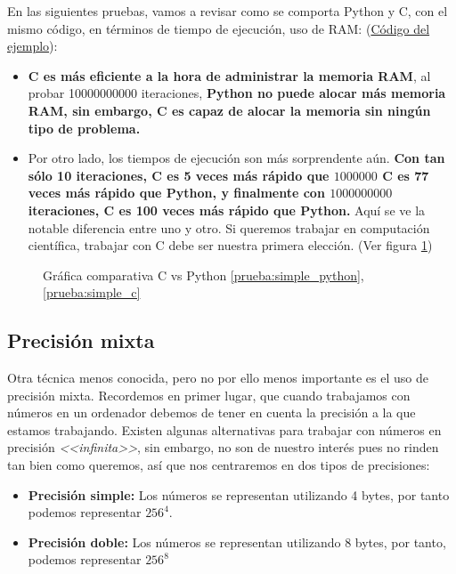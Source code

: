 En las siguientes pruebas, vamos a revisar como se comporta Python y C, con el mismo código, en términos de tiempo de ejecución, uso de RAM: (\hyperref[prueba:cvspython]{Código del ejemplo}):

\begin{itemize}
\item \textbf{C es más eficiente a la hora de administrar la memoria RAM}, al probar 10000000000 iteraciones, \textbf{Python no puede alocar más memoria RAM, sin embargo, C es capaz de alocar la memoria sin ningún tipo de problema.}
  
\item Por otro lado, los tiempos de ejecución son más sorprendente aún. \textbf{Con tan sólo 10 iteraciones, C es 5 veces más rápido que $1000000$ C es 77 veces más rápido que Python, y finalmente con $1000000000$ iteraciones, C es 100 veces más rápido que Python.} Aquí se ve la notable diferencia entre uno y otro. Si queremos trabajar en computación científica, trabajar con C debe ser nuestra primera elección. (Ver figura \ref{fig:cvspython})
\end{itemize}

\begin{figure}[h]
  \centering
  \caption{Gráfica comparativa C vs Python \ref{prueba:simple_python}, \ref{prueba:simple_c}}
  \label{fig:cvspython}
\end{figure}

\subsection{Precisión mixta}
Otra técnica menos conocida, pero no por ello menos importante es el uso de precisión mixta. Recordemos en primer lugar, que cuando trabajamos con números en un ordenador debemos de tener en cuenta la precisión a la que estamos trabajando. Existen algunas alternativas para trabajar con números en precisión \textit{<<infinita>>}, sin embargo, no son de nuestro interés pues no rinden tan bien como queremos, así que nos centraremos en dos tipos de precisiones:

\begin{itemize}
\item \textbf{Precisión simple: } Los números se representan utilizando 4 bytes, por tanto podemos representar $256^4$.
  
\item \textbf{Precisión doble: } Los números se representan utilizando 8 bytes, por tanto, podemos representar $256^8$
\end{itemize}

